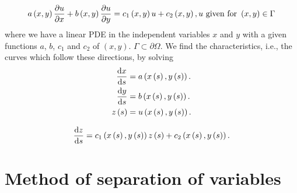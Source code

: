 \begin{equation*}
	a\left(x,y\right)\diffp{u}{x}+
	b\left(x,y\right)\diffp{u}{y}=
	c_{1}\left(x,y\right)u+
	c_{2}\left(x,y\right),
	u\text{ given for }\left(x,y\right)\in\Gamma
\end{equation*}
where we have a linear PDE in the independent variables $x$ and $y$
with a given functions $a$, $b$, $c_{1}$ and $c_{2}$ of $\left(x,y\right)$.
$\Gamma\subset\partial\Omega$.
We find the characteristics, i.e., the curves which follow these directions, by solving
\begin{align*}
	\diff{x}{s}     & =
	a\left(x\left(s\right),y\left(s\right)\right). \\
	\diff{y}{s}     & =
	b\left(x\left(s\right),y\left(s\right)\right). \\
	z\left(s\right) & =
	u\left(x\left(s\right),y\left(s\right)\right).
\end{align*}

\begin{equation*}
	\diff{z}{s}=
	c_{1}\left(x\left(s\right),y\left(s\right)\right)
	z\left(s\right)+
	c_{2}\left(x\left(s\right),y\left(s\right)\right).
\end{equation*}

\section{Method of separation of variables}

